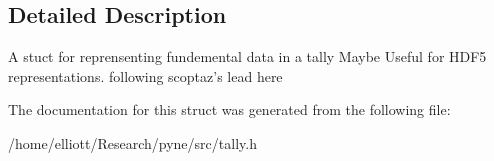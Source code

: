 \subsection{Detailed Description}
A stuct for reprensenting fundemental data in a tally Maybe Useful for H\-D\-F5 representations. following scoptaz's lead here 

The documentation for this struct was generated from the following file\-:\begin{DoxyCompactItemize}
\item 
/home/elliott/\-Research/pyne/src/tally.\-h\end{DoxyCompactItemize}
